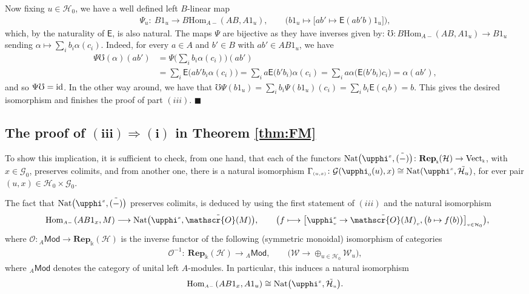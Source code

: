 \documentclass[10pt,a4paper]{amsart}
\numberwithin{equation}{section}
\newcommand{\Sf}[1]{\mathsf{#1}}
\newcommand{\lmod}[1]{{}_{#1}\Sf{Mod}}
\renewcommand{\hom}[3]{\mathrm{Hom}_{\Sscript{#1}}\left(#2, #3\right)}
\newcommand{\Rep}[1]{\mathbf{Rep}_{\Sscript{\Bbbk}}(#1)}
\newcommand{\Vect}{{\rm Vect}_{\Sscript{\Bbbk}}}
\newcommand{\Go}{\cG_{\Sscript{0}}}
\newcommand{\Ho}{\cH_{\Sscript{0}}}
\newcommand{\Wu}{\cW_{\Sscript{u}}}
\newcommand{\oO}{\mathscr{O}}
\newcommand{\cG}{{\mathcal G}}
\newcommand{\cH}{{\mathcal H}}
\newcommand{\cW}{{\mathcal W}}
\newcommand{\Sscript}[1]{\scriptscriptstyle{#1}}
\newcommand{\phio}{\upphi_{\Sscript{0}}}
\newcommand*{\QEDA}{\hfill\ensuremath{\blacksquare}}%
\begin{document}
Now fixing $u \in \Ho$, we have a well defined left $B$-linear map
\begin{gather*}
\Psi_{u}\colon \ B1_{u} \longrightarrow B\hom{A-}{AB}{A1_{u}}, \qquad \big( b1_{u} \longmapsto \big[ ab' \mapsto \Sf{E}(ab'b) 1_{u} \big] \big),
\end{gather*}
which, by the naturality of $\Sf{E}$, is also natural. The maps $\Psi$ are bijective as they have inverses given by: $\mho\colon B\hom{A-}{AB}{A1_{u}} \to B1_{u}$ sending $\alpha \mapsto \sum_{i}b_{i}\alpha(c_{i})$. Indeed, for every $a \in A$ and $b' \in B$ with $ab' \in AB1_{u}$, we have
\begin{align*}
\Psi\mho(\alpha) (ab') &= \Psi\bigg( \sum_{i} b_{i}\alpha(c_{i})\bigg) (ab') \\
&= \sum_{i} \Sf{E}\big( ab'b_{i}\alpha(c_{i})\big) = \sum_{i} a \Sf{E}\big(b'b_{i}\big)\alpha(c_{i}) = \sum_{i} a \alpha\big( \Sf{E}\big( b'b_{i}\big)c_{i}\big) = \alpha(ab'),
\end{align*}
and so $\Psi\mho={\rm id}$. In the other way around, we have that $\mho \Psi(b1_{u}) = \sum_{i}b_{i}\Psi(b1_{u})(c_{i}) = \sum_{i} b_{i}\Sf{E}(c_{i}b) = b$. This gives the desired isomorphism and finishes the proof of part $(iii)$. \QEDA

\subsection[The proof of $(iii) \Rightarrow (i)$ in Theorem \ref{thm:FM}]{The proof of $\boldsymbol{(iii) \Rightarrow (i)}$ in Theorem \ref{thm:FM}}\label{sssec:III-IV}
To show this implication, it is sufficient to check, from one hand, that each of the functors ${\rm Nat}\big(\upphi^{\Sscript{x}}, \tilde{(-)}\big)\colon \Rep{\cH} \to \Vect$, with $x \in \Go$, preserves colimits, and from another one, there is a natural isomorphism $\Gamma_{\Sscript{(u, x)}}\colon \cG(\phio(u), x) \cong {\rm Nat}(\upphi^{\Sscript{x}}, \tilde{\cH_{u}})$, for ever pair $(u, x) \in \Ho \times \Go$.

The fact that ${\rm Nat}\big(\upphi^{\Sscript{x}}, \tilde{(-)}\big)$ preserves colimits, is deduced by using the first statement of $(iii)$ and the natural isomorphism
\begin{gather}\label{Eq:Calentaminetoglobal}
\hom{A-}{AB1_{x}}{M} \longrightarrow {\rm Nat}\big(\upphi^{\Sscript{x}}, \tilde{\oO(M)}\big),\qquad \big( f \longmapsto \big[ \upphi^{\Sscript{x}}_{\Sscript{v}} \to \tilde{\oO(M)}_{\Sscript{v}}, \big( b \mapsto f(b)
\big)\big]_{\Sscript{v \in \Ho}} \big),\!\!\!
\end{gather}
where $\oO\colon \lmod{A} \to \Rep{\cH}$ is the inverse functor of the following (symmetric monoidal) isomorphism of categories
\begin{gather*}
\oO^{-1}\colon \ \Rep{\cH} \longrightarrow \lmod{A}, \qquad \big( \cW \longrightarrow \oplus_{u \in \Ho} \Wu \big),
\end{gather*}
where $\lmod{A}$ denotes the category of unital left $A$-modules. In particular, this induces a natural isomorphism
\begin{gather*}
\hom{A-}{AB1_{x}}{A1_{u}} \cong {\rm Nat}\big(\upphi^{\Sscript{x}}, \tilde{\cH_{\Sscript{u}}}\big).
\end{gather*}
\end{document}
